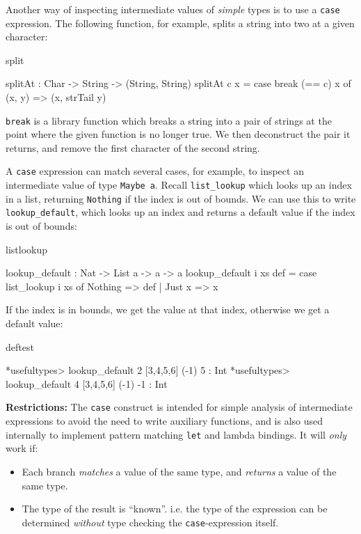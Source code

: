 Another way of inspecting intermediate values of \emph{simple} types
is to use a \texttt{case} expression.
The following function, for example, splits a string into two at a given character:

\begin{SaveVerbatim}{split}

splitAt : Char -> String -> (String, String)
splitAt c x = case break (== c) x of {
                  (x, y) => (x, strTail y)
              }

\end{SaveVerbatim}

\noindent
\texttt{break} is a library function which breaks a string into a pair of strings
at the point where the given function is no longer true. We then deconstruct the
pair it returns, and remove the first character of the second string.

A \texttt{case} expression can match several cases, for example, to inspect an
intermediate value of type \texttt{Maybe a}. Recall \texttt{list\_lookup} which
looks up an index in a list, returning \texttt{Nothing} if the index is out
of bounds. We can use this to write \texttt{lookup\_default}, which
looks up an index and returns a default value if the index is out of bounds:

\begin{SaveVerbatim}{listlookup}

lookup_default : Nat -> List a -> a -> a
lookup_default i xs def = case list_lookup i xs of {
                              Nothing => def
                            | Just x => x
                          }

\end{SaveVerbatim}

\noindent
If the index is in bounds, we get the value at that index, otherwise we get
a default value:

\begin{SaveVerbatim}{deftest}

*usefultypes> lookup_default 2 [3,4,5,6] (-1)
5 : Int
*usefultypes> lookup_default 4 [3,4,5,6] (-1)
-1 : Int

\end{SaveVerbatim}

\noindent
\textbf{Restrictions:} The \texttt{case} construct is intended for simple analysis
of intermediate expressions to avoid the need to write auxiliary functions, and is
also used internally to implement pattern matching \texttt{let} and lambda bindings. 
It will \emph{only} work if:

\begin{itemize}
\item Each branch \emph{matches} a value of the same type, and \emph{returns} a
value of the same type.
\item The type of the result is ``known''. i.e. the type of the expression can be
determined \emph{without} type checking the \texttt{case}-expression itself. 
\end{itemize}

